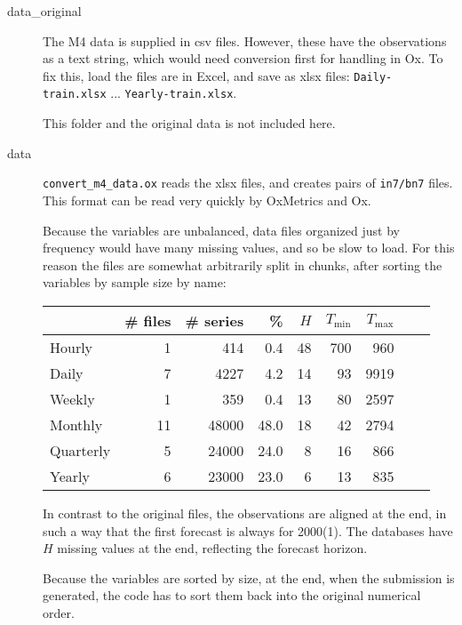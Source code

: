 \documentclass[11pt,a4paper]{article}
\begin{document}
\begin{description}
\item[data\_original] The M4 data is supplied in csv files. However, these have the observations as a text string, which
would need conversion first for handling in Ox. To fix this, load the files are in Excel, and save as xlsx files:
\texttt{Daily-train.xlsx} ... \texttt{Yearly-train.xlsx}.

This folder and the original data is not included here.

\item[data] \texttt{convert\_m4\_data.ox} reads the xlsx files, and creates pairs of \texttt{in7/bn7} files.
This format can be read very quickly by OxMetrics and Ox.

Because the variables are unbalanced, data files organized just by frequency would have many missing values, and so be slow to load.
For this reason the files are somewhat arbitrarily split in chunks, after sorting the variables by sample size by name:

\begin{center}
\begin{tabular}{lrrrrrrrr}
\toprule
    & \# files & \# series & \%  &$H$ & $T_{\text{min}}$& $T_{\text{max}}$ \\
\midrule
Hourly       & 1  &  414&  0.4&     48& 700&   960\\
Daily        & 7  & 4227&  4.2&     14&  93&  9919\\
Weekly       & 1  &  359&  0.4&     13&  80&  2597\\
Monthly      & 11 &48000& 48.0&     18&  42&  2794\\
Quarterly    & 5  &24000& 24.0&      8&  16&   866\\
Yearly       & 6  &23000& 23.0&      6&  13&   835\\
\bottomrule
\end{tabular}
\end{center}

In contrast to the original files, the observations are aligned at the end, in such a way that the first forecast
is always for 2000(1). The databases have $H$ missing values at the end, reflecting the forecast horizon.

Because the variables are sorted by size, at the end, when the submission is generated, the code has to
sort them back into the original numerical order.

\end{description}
\end{document}
